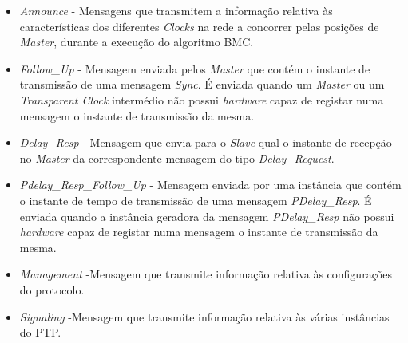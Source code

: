 \begin{itemize}
  \item \textit{Announce}  - \quad Mensagens que transmitem a informação relativa às características dos diferentes \textit{Clocks} na rede a concorrer pelas posições de \textit{Master}, durante a execução do algoritmo BMC.
  \item \textit{Follow\_Up}  - \quad  Mensagem enviada pelos \textit{Master} que contém o instante de transmissão de uma mensagem \textit{Sync}. É enviada quando um \textit{Master} ou um \textit{Transparent Clock} intermédio não possui \textit{hardware} capaz de registar numa mensagem o instante de transmissão da mesma.
  \item \textit{Delay\_Resp}  - \quad Mensagem que envia para o \textit{Slave} qual o instante de recepção no \textit{Master} da correspondente mensagem do tipo \textit{Delay\_Request}.
  \item \textit{Pdelay\_Resp\_Follow\_Up} - \quad Mensagem enviada por uma instância que contém o instante de tempo de transmissão de uma mensagem \textit{PDelay\_Resp}. É enviada quando a instância geradora da mensagem \textit{PDelay\_Resp} não possui \textit{hardware} capaz de registar numa mensagem o instante de transmissão da mesma.
  \item \textit{Management} -\quad Mensagem que transmite informação relativa às configurações do protocolo.
  \item \textit{Signaling} -\quad Mensagem que transmite informação relativa às várias instâncias do PTP.  
\end{itemize}


